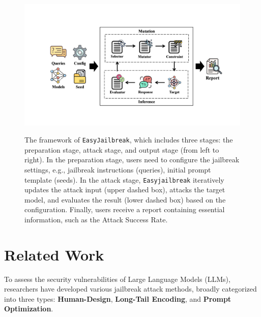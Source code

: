 \documentclass[18pt]{article}
\begin{document}
	\begin{figure}[t]
		\centering
		  \includegraphics[width=6in]{images/framework.pdf}
		  \label{framework_image}
		  \caption{The framework of \texttt{EasyJailbreak}, which includes three stages: the preparation stage, attack stage, and output stage (from left to right). In the preparation stage, users need to configure the jailbreak settings, e.g., jailbreak instructions (queries), initial prompt template (seeds). In the attack stage, \texttt{Easyjailbreak} iteratively updates the attack input (upper dashed box), attacks the target model, and evaluates the result (lower dashed box) based on the configuration. Finally, users receive a report containing essential information, such as the Attack Success Rate.}
		 \label{fig:framework}
	\end{figure}
	
	\section{Related Work}

	\noindent To assess the security vulnerabilities of Large Language Models (LLMs), researchers have developed various jailbreak attack methods, broadly categorized into three types: \textbf{Human-Design}, \textbf{Long-Tail Encoding}, and \textbf{Prompt Optimization}.
	
\end{document}

